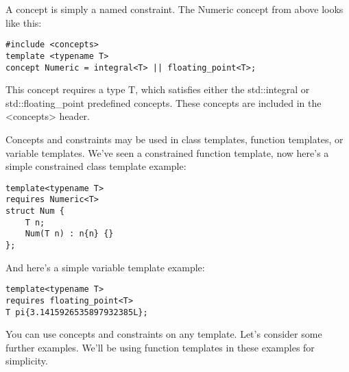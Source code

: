 A concept is simply a named constraint. The Numeric concept from above looks like this:

\begin{lstlisting}[style=styleCXX]
#include <concepts>
template <typename T>
concept Numeric = integral<T> || floating_point<T>;
\end{lstlisting}

This concept requires a type T, which satisfies either the std::integral or std::floating\_point predefined concepts. These concepts are included in the <concepts> header.

Concepts and constraints may be used in class templates, function templates, or variable templates. We've seen a constrained function template, now here's a simple constrained class template example:

\begin{lstlisting}[style=styleCXX]
template<typename T>
requires Numeric<T>
struct Num {
	T n;
	Num(T n) : n{n} {}
};
\end{lstlisting}

And here's a simple variable template example:

\begin{lstlisting}[style=styleCXX]
template<typename T>
requires floating_point<T>
T pi{3.1415926535897932385L};
\end{lstlisting}

You can use concepts and constraints on any template. Let's consider some further examples. We'll be using function templates in these examples for simplicity.

